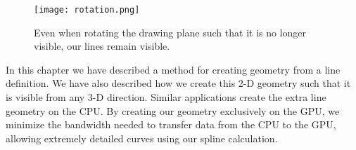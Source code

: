 \begin{figure}
\begin{center}
\texttt{[image: rotation.png]}
\caption{Even when rotating the drawing plane such that it is no longer visible, our lines remain visible.}
\end{center}
\end{figure}

In this chapter we have described a method for creating geometry from a line definition.
We have also described how we create this 2-D geometry such that it is visible from any 3-D direction.
Similar applications create the extra line geometry on the CPU.
By creating our geometry exclusively on the GPU, we minimize the bandwidth needed to transfer data from the CPU to the GPU, allowing extremely detailed curves using our spline calculation.